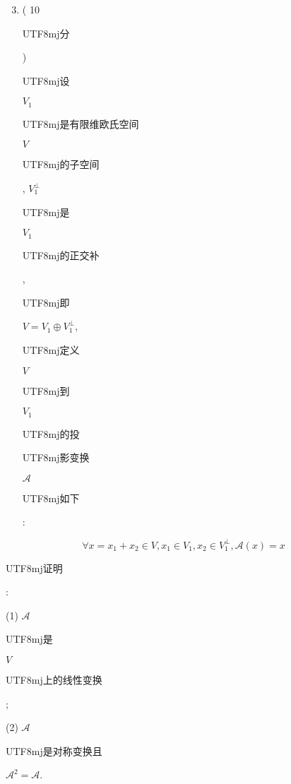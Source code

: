 \documentclass[10pt]{article}
\begin{document}
\begin{enumerate}
  \setcounter{enumi}{2}
  \item ( 10 \begin{CJK}{UTF8}{mj}分\end{CJK}) \begin{CJK}{UTF8}{mj}设\end{CJK} $V_{1}$ \begin{CJK}{UTF8}{mj}是有限维欧氏空间\end{CJK} $V$ \begin{CJK}{UTF8}{mj}的子空间\end{CJK}, $V_{1}^{\perp}$ \begin{CJK}{UTF8}{mj}是\end{CJK} $V_{1}$ \begin{CJK}{UTF8}{mj}的正交补\end{CJK}, \begin{CJK}{UTF8}{mj}即\end{CJK} $V=V_{1} \oplus V_{1}^{\perp}$, \begin{CJK}{UTF8}{mj}定义\end{CJK} $V$ \begin{CJK}{UTF8}{mj}到\end{CJK} $V_{1}$ \begin{CJK}{UTF8}{mj}的投\end{CJK} \begin{CJK}{UTF8}{mj}影变换\end{CJK} $\mathscr{A}$ \begin{CJK}{UTF8}{mj}如下\end{CJK}:
\end{enumerate}
$$
\forall x=x_{1}+x_{2} \in V, x_{1} \in V_{1}, x_{2} \in V_{1}^{\perp}, \mathscr{A}(x)=x
$$
\begin{CJK}{UTF8}{mj}证明\end{CJK}:

(1) $\mathscr{A}$ \begin{CJK}{UTF8}{mj}是\end{CJK} $V$ \begin{CJK}{UTF8}{mj}上的线性变换\end{CJK};

(2) $\mathscr{A}$ \begin{CJK}{UTF8}{mj}是对称变换且\end{CJK} $\mathscr{A}^{2}=\mathscr{A}$.
\end{document}
